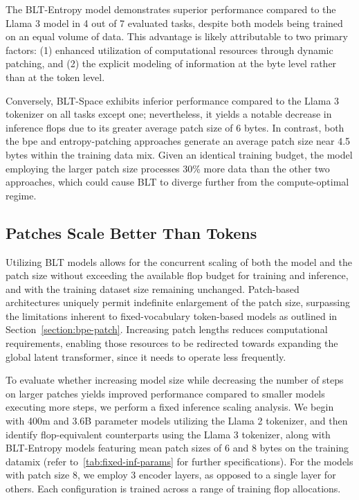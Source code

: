 The {\textsc BLT}-Entropy model demonstrates superior performance compared to the Llama 3 model in 4 out of 7 evaluated tasks, despite both models being trained on an equal volume of data. This advantage is likely attributable to two primary factors: (1) enhanced utilization of computational resources through dynamic patching, and (2) the explicit modeling of information at the byte level rather than at the token level.

Conversely, {\textsc BLT}-Space exhibits inferior performance compared to the Llama 3 tokenizer on all tasks except one; nevertheless, it yields a notable decrease in inference flops due to its greater average patch size of 6 bytes. In contrast, both the bpe and entropy-patching approaches generate an average patch size near 4.5 bytes within the training data mix. Given an identical training budget, the model employing the larger patch size processes 30\% more data than the other two approaches, which could cause {\textsc BLT} to diverge further from the compute-optimal regime.

\subsection{Patches Scale Better Than Tokens} Utilizing {\textsc BLT} models allows for the concurrent scaling of both the model and the patch size without exceeding the available flop budget for training and inference, and with the training dataset size remaining unchanged. Patch-based architectures uniquely permit indefinite enlargement of the patch size, surpassing the limitations inherent to fixed-vocabulary token-based models as outlined in Section~\ref{section:bpe-patch}. Increasing patch lengths reduces computational requirements, enabling those resources to be redirected towards expanding the global latent transformer, since it needs to operate less frequently.

To evaluate whether increasing model size while decreasing the number of steps on larger patches yields improved performance compared to smaller models executing more steps, we perform a fixed inference scaling analysis. We begin with 400m and 3.6B parameter models utilizing the Llama 2 tokenizer, and then identify flop-equivalent counterparts using the Llama 3 tokenizer, along with {\textsc BLT}-Entropy models featuring mean patch sizes of 6 and 8 bytes on the training datamix (refer to~\autoref{tab:fixed-inf-params} for further specifications). For the models with patch size 8, we employ 3 encoder layers, as opposed to a single layer for others. Each configuration is trained across a range of training flop allocations.


